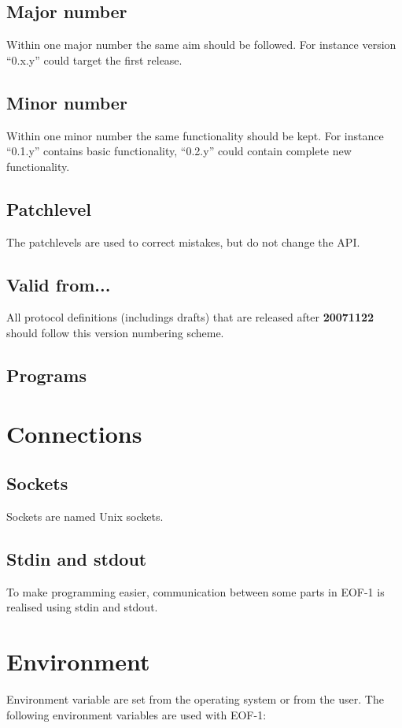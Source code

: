\documentclass[12pt,a4paper]{article}
\begin{document}
\subsection{Major number}
Within one major number the same aim should be followed. For instance
version "`0.x.y"' could target the first release.
\subsection{Minor number}
Within one minor number the same functionality should be kept.
For instance "`0.1.y"' contains basic functionality, "`0.2.y"' could
contain complete new functionality.
\subsection{Patchlevel}
The patchlevels are used to correct mistakes, but do not change the API.
\subsection{Valid from...}
All protocol definitions (includings drafts) that are released after
\textbf{20071122} should follow this version numbering scheme.
\subsection{Programs}
\section{Connections}
\subsection{Sockets}
Sockets are named Unix sockets.
\subsection{Stdin  and stdout}
To make programming easier, communication between some parts in EOF-1 is realised
using stdin and stdout. 
\section{Environment}
Environment variable are set from the operating system or from the user.
The following environment variables are used with EOF-1:
\end{document}
